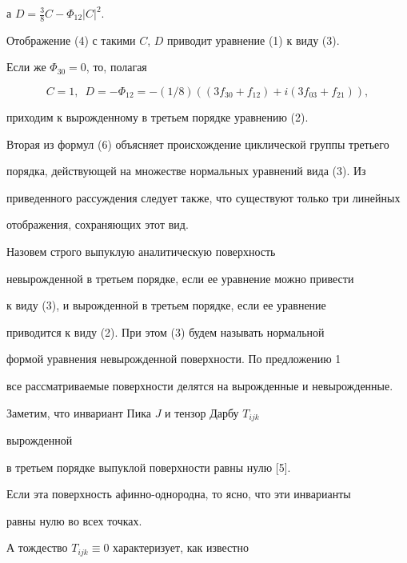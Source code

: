 а $D=\frac38 C - \Phi_{12} | C | ^2$.





Отображение (4) с такими $C$, $D$ приводит уравнение (1) к виду (3).





Если же $\Phi_{30}=0$, то, полагая


$$


C=1, \ \; D=- \Phi_{12}=


 - (1/8) ((3 f_{30}+f_{12})+i (3 f_{03}+f_{21})) ,


$$


приходим к вырожденному в третьем порядке уравнению (2).





Вторая из формул (6) объясняет происхождение циклической группы третьего


порядка, действующей на множестве нормальных уравнений вида (3). Из


приведенного рассуждения следует также, что существуют только три линейных


отображения, сохраняющих этот вид.





Назовем строго выпуклую аналитическую поверхность


невырожденной в третьем порядке, если ее уравнение можно привести


к виду (3), и вырожденной в третьем порядке, если ее уравнение


приводится к виду (2). При этом (3) будем называть нормальной


формой уравнения невырожденной поверхности. По предложению 1


все рассматриваемые поверхности делятся на вырожденные и невырожденные.





Заметим, что инвариант Пика $J$ и тензор Дарбу $T_{ijk}$


вырожденной


в третьем порядке выпуклой поверхности равны нулю [5].


Если эта поверхность афинно-однородна, то ясно, что эти инварианты


равны нулю во всех точках.


А тождество $T_{ijk} \equiv 0$ характеризует, как известно


